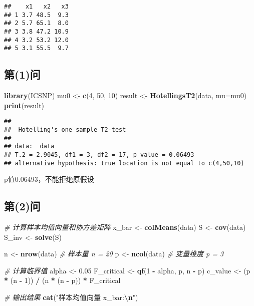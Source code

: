 \documentclass[
]{ctexart}
\newenvironment{Shaded}{\begin{snugshade}}{\end{snugshade}}
\newcommand{\AttributeTok}[1]{\textcolor[rgb]{0.13,0.29,0.53}{#1}}
\newcommand{\CommentTok}[1]{\textcolor[rgb]{0.56,0.35,0.01}{\textit{#1}}}
\newcommand{\DecValTok}[1]{\textcolor[rgb]{0.00,0.00,0.81}{#1}}
\newcommand{\FloatTok}[1]{\textcolor[rgb]{0.00,0.00,0.81}{#1}}
\newcommand{\FunctionTok}[1]{\textcolor[rgb]{0.13,0.29,0.53}{\textbf{#1}}}
\newcommand{\NormalTok}[1]{#1}
\newcommand{\OtherTok}[1]{\textcolor[rgb]{0.56,0.35,0.01}{#1}}
\newcommand{\SpecialCharTok}[1]{\textcolor[rgb]{0.81,0.36,0.00}{\textbf{#1}}}
\newcommand{\StringTok}[1]{\textcolor[rgb]{0.31,0.60,0.02}{#1}}
\begin{document}
\begin{verbatim}
##    x1   x2   x3
## 1 3.7 48.5  9.3
## 2 5.7 65.1  8.0
## 3 3.8 47.2 10.9
## 4 3.2 53.2 12.0
## 5 3.1 55.5  9.7
\end{verbatim}

\subsection{第(1)问}\label{ux7b2c1ux95ee}

\begin{Shaded}
\begin{Highlighting}[]
\FunctionTok{library}\NormalTok{(ICSNP)}
\NormalTok{mu0 }\OtherTok{\textless{}{-}} \FunctionTok{c}\NormalTok{(}\DecValTok{4}\NormalTok{, }\DecValTok{50}\NormalTok{, }\DecValTok{10}\NormalTok{)}
\NormalTok{result }\OtherTok{\textless{}{-}} \FunctionTok{HotellingsT2}\NormalTok{(data, }\AttributeTok{mu=}\NormalTok{mu0)}
\FunctionTok{print}\NormalTok{(result)}
\end{Highlighting}
\end{Shaded}

\begin{verbatim}
## 
##  Hotelling's one sample T2-test
## 
## data:  data
## T.2 = 2.9045, df1 = 3, df2 = 17, p-value = 0.06493
## alternative hypothesis: true location is not equal to c(4,50,10)
\end{verbatim}

p值0.06493，不能拒绝原假设

\subsection{第(2)问}\label{ux7b2c2ux95ee}

\begin{Shaded}
\begin{Highlighting}[]
\CommentTok{\# 计算样本均值向量和协方差矩阵}
\NormalTok{x\_bar }\OtherTok{\textless{}{-}} \FunctionTok{colMeans}\NormalTok{(data)}
\NormalTok{S }\OtherTok{\textless{}{-}} \FunctionTok{cov}\NormalTok{(data)}
\NormalTok{S\_inv }\OtherTok{\textless{}{-}} \FunctionTok{solve}\NormalTok{(S)}

\NormalTok{n }\OtherTok{\textless{}{-}} \FunctionTok{nrow}\NormalTok{(data)  }\CommentTok{\# 样本量 n = 20}
\NormalTok{p }\OtherTok{\textless{}{-}} \FunctionTok{ncol}\NormalTok{(data)  }\CommentTok{\# 变量维度 p = 3}

\CommentTok{\# 计算临界值}
\NormalTok{alpha }\OtherTok{\textless{}{-}} \FloatTok{0.05}
\NormalTok{F\_critical }\OtherTok{\textless{}{-}} \FunctionTok{qf}\NormalTok{(}\DecValTok{1} \SpecialCharTok{{-}}\NormalTok{ alpha, p, n }\SpecialCharTok{{-}}\NormalTok{ p)}
\NormalTok{c\_value }\OtherTok{\textless{}{-}}\NormalTok{ (p }\SpecialCharTok{*}\NormalTok{ (n }\SpecialCharTok{{-}} \DecValTok{1}\NormalTok{)) }\SpecialCharTok{/}\NormalTok{ (n }\SpecialCharTok{*}\NormalTok{ (n }\SpecialCharTok{{-}}\NormalTok{ p)) }\SpecialCharTok{*}\NormalTok{ F\_critical}

\CommentTok{\# 输出结果}
\FunctionTok{cat}\NormalTok{(}\StringTok{"样本均值向量 x\_bar:}\SpecialCharTok{\textbackslash{}n}\StringTok{"}\NormalTok{)}
\end{Highlighting}
\end{Shaded}
\end{document}
